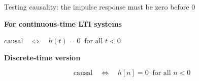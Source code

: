\documentclass[aspectratio=169,11pt]{beamer}
\newcommand{\CardTitleSize}{\large}
\newcommand{\CardTitle}[1]{%
  \vspace{0.15cm}
  {\CardTitleSize\bfseries #1}\par
}
\begin{document}
\begin{frame}{Testing causality: the impulse response must be zero before \(0\)}

\begin{center}
\begin{GreenCard}[
  width=\textwidth,
  halign=center,
  top=12pt,
  bottom=12pt
]
\CardTitle{For continuous-time LTI systems}

\vspace{0.28cm}

{\Large
\(
\boxed{
\text{causal}
\quad\Longleftrightarrow\quad
h(t)=0\ \text{ for all }t<0
}
\)
}



\end{GreenCard}
\end{center}

\vspace{0.14cm}

\begin{center}
\begin{BlueCard}[
  width=0.88\textwidth,
  halign=center,
  top=10pt,
  bottom=10pt
]
\CardTitle{Discrete-time version}

\[
\boxed{
\text{causal}
\quad\Longleftrightarrow\quad
h[n]=0\ \text{ for all }n<0
}
\]

\end{BlueCard}
\end{center}

\end{frame}
\end{document}
